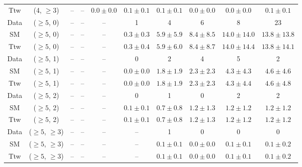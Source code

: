 \begin{table}[h!]
{\begin{tabular}{cccccccccc}
	Ttw & (4, $\ge3$) & -- & -- & $0.0\pm 0.0$ & $0.1\pm 0.1$ & $0.1\pm 0.1$ & $0.0\pm 0.0$ & $0.0\pm 0.0$ & $0.1\pm 0.1$ \\[0.5ex] 
	Data & ($\ge5$, 0) & -- & -- & -- & 1 & 4 & 6 & 8 & 23 \\[0.5ex] 
	SM & ($\ge5$, 0) & -- & -- & -- & $0.3\pm 0.3$ & $5.9\pm 5.9$ & $8.4\pm 8.5$ & $14.0\pm 14.0$ & $13.8\pm 13.8$ \\[0.5ex] 
	Ttw & ($\ge5$, 0) & -- & -- & -- & $0.3\pm 0.4$ & $5.9\pm 6.0$ & $8.4\pm 8.7$ & $14.0\pm 14.4$ & $13.8\pm 14.1$ \\[0.5ex] 
	Data & ($\ge5$, 1) & -- & -- & -- & 0 & 2 & 4 & 5 & 2 \\[0.5ex] 
	SM & ($\ge5$, 1) & -- & -- & -- & $0.0\pm 0.0$ & $1.8\pm 1.9$ & $2.3\pm 2.3$ & $4.3\pm 4.3$ & $4.6\pm 4.6$ \\[0.5ex] 
	Ttw & ($\ge5$, 1) & -- & -- & -- & $0.0\pm 0.0$ & $1.8\pm 1.9$ & $2.3\pm 2.3$ & $4.3\pm 4.4$ & $4.6\pm 4.8$ \\[0.5ex] 
	Data & ($\ge5$, 2) & -- & -- & -- & 0 & 1 & 0 & 2 & 2 \\[0.5ex] 
	SM & ($\ge5$, 2) & -- & -- & -- & $0.1\pm 0.1$ & $0.7\pm 0.8$ & $1.2\pm 1.3$ & $1.2\pm 1.2$ & $1.2\pm 1.2$ \\[0.5ex] 
	Ttw & ($\ge5$, 2) & -- & -- & -- & $0.1\pm 0.1$ & $0.7\pm 0.8$ & $1.2\pm 1.3$ & $1.2\pm 1.2$ & $1.2\pm 1.2$ \\[0.5ex] 
	Data & ($\ge5$, $\ge3$) & -- & -- & -- & -- & 1 & 0 & 0 & 0 \\[0.5ex] 
	SM & ($\ge5$, $\ge3$) & -- & -- & -- & -- & $0.1\pm 0.1$ & $0.0\pm 0.0$ & $0.1\pm 0.1$ & $0.1\pm 0.2$ \\[0.5ex] 
	Ttw & ($\ge5$, $\ge3$) & -- & -- & -- & -- & $0.1\pm 0.1$ & $0.0\pm 0.0$ & $0.1\pm 0.1$ & $0.1\pm 0.2$ \\[0.5ex] 
	\hline
	\hline
\end{tabular}}
\end{table}
